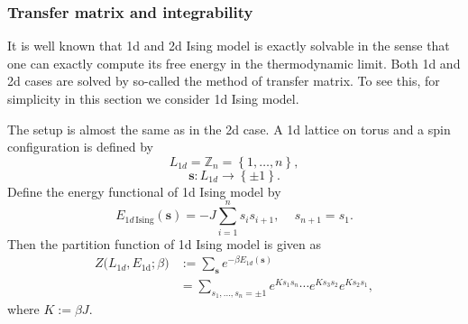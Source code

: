 \subsubsection{Transfer matrix and integrability}

It is well known that 1d and 2d Ising model is exactly solvable in
the sense that one can exactly compute its free energy in the thermodynamic
limit. Both 1d and 2d cases are solved by so-called the method of
transfer matrix. To see this, for simplicity in this section we consider
1d Ising model.

The setup is almost the same as in the 2d case. A 1d lattice on torus
and a spin configuration is defined by
\begin{equation}
L_{1d}  =  \mathbb{Z}_{n}  =  \left\{ 1,\ldots,n\right\} ,
\end{equation}
%
\begin{equation}
\mathbf{s}  :  L_{1d}  \longrightarrow  \left\{ \pm1\right\} .
\end{equation}
Define the energy functional of 1d Ising model by
\begin{equation}
  E_{1d\,\mathrm{Ising}}(\mathbf{s})  =  -J\sum_{i=1}^{n}s_{i}s_{i+1},\quad\,s_{n+1}=s_{1}.
\end{equation}
Then the partition function of 1d Ising model is given as
\begin{align}
  Z\big(L_{1d},E_{\mathrm{1d}};\beta\big)
  & :=  \sum_{\mathbf{s}}  e^{-\beta E_{1d}(\mathbf{s})}\nonumber \\
  & =   \sum_{s_{1},\ldots,s_{n}=\pm1}  e^{Ks_{1}s_{n}}  \cdots  e^{Ks_{3}s_{2}}e^{Ks_{2}s_{1}},
\end{align}
 where $K:=\beta J$.


